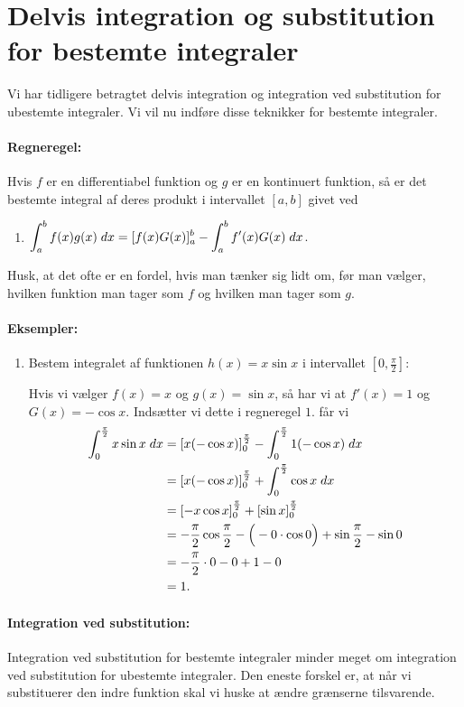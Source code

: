 \section{Delvis integration og substitution for bestemte integraler}
\noindent Vi har tidligere betragtet delvis integration og integration ved substitution for ubestemte integraler. Vi vil nu indføre disse teknikker for bestemte integraler.

\paragraph*{Regneregel:}
Hvis $f$ er en differentiabel funktion og $g$ er en kontinuert funktion, så er det bestemte integral af deres produkt i intervallet $[a,b]$ givet ved
\begin{enumerate}
\item $\displaystyle \int_a^b f(x)g(x) \; d x = [f(x)G(x)]_a^b - \int_a^b f'(x)G(x) \; d x$.
\end{enumerate}
Husk, at det ofte er en fordel, hvis man tænker sig lidt om, før man vælger, hvilken funktion man tager som $f$ og hvilken man tager som $g$. 
\paragraph*{Eksempler:}
\begin{enumerate}
\item Bestem integralet af funktionen $h(x)=x \sin x$ i intervallet $[0,\frac{\pi}{2}]$:

Hvis vi vælger $f(x)=x$ og $g(x)=\sin x$, så har vi at $f'(x)=1$ og $G(x)=-\cos x$. Indsætter vi dette i regneregel $1$. får vi
\begin{align*}
\int_0^\frac{\pi}{2} x \sin x \; d x &= [x  (- \cos x)]_0^\frac{\pi}{2}-\int_0^\frac{\pi}{2} 1 (-\cos x ) \; d x \\
&= [x  (- \cos x)]_0^\frac{\pi}{2}+\int_0^\frac{\pi}{2} \cos x  \; d x \\
&=[-x\cos x]_0^\frac{\pi}{2}  + [\sin x]_0^\frac{\pi}{2} \\
&=- \frac{\pi}{2} \cos \frac{\pi}{2} - \Big( -0 \cdot \cos 0 \Big) + \sin \frac{\pi}{2} - \sin 0 \\
&= - \frac{\pi}{2} \cdot 0 - 0 + 1 - 0 \\
&= 1.
\end{align*}
\end{enumerate}

\paragraph*{Integration ved substitution:}
Integration ved substitution for bestemte integraler minder meget om integration ved substitution for ubestemte integraler. Den eneste forskel er, at når vi substituerer den indre funktion skal vi huske at ændre grænserne tilsvarende.

